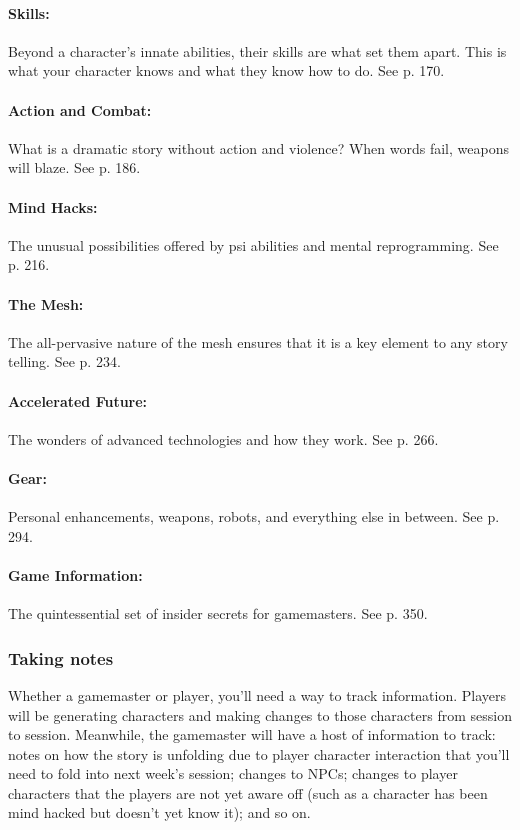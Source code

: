 \paragraph{Skills:} Beyond a character's innate abilities, their skills are what set them apart. This is what your character knows and what they know how to do. See p. 170. 

\paragraph{Action and Combat:} What is a dramatic story without action and violence? When words fail, weapons will blaze. See p. 186. 

\paragraph{Mind Hacks:} The unusual possibilities offered by psi abilities and mental reprogramming. See p. 216. 

\paragraph{The Mesh:} The all-pervasive nature of the mesh ensures that it is a key element to any story telling. See p. 234. 

\paragraph{Accelerated Future:} The wonders of advanced technologies and how they work. See p. 266. 

\paragraph{Gear:} Personal enhancements, weapons, robots, and everything else in between. See p. 294. 

\paragraph{Game Information:} The quintessential set of insider secrets for gamemasters. See p. 350. 



\subsubsection{Taking notes} \label{sec:taking-notes} 

Whether a gamemaster or player, you'll need a way to track information. Players will be generating characters and making changes to those characters from session to session. Meanwhile, the gamemaster will have a host of information to track: notes on how the story is unfolding due to player character interaction that you'll need to fold into next week's session; changes to NPCs; changes to player characters that the players are not yet aware off (such as a character has been mind hacked but doesn't yet know it); and so on. 

